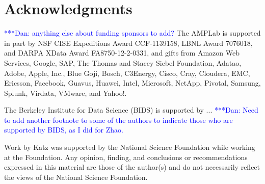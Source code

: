\documentclass{sig-alternate}
\newcommand{\katznote}[1]{ {\textcolor{blue}    { ***Dan:      #1 }}}
\newcommand{\zhaonote}[1]{{\textcolor{cyan}    { ***Zhao:      #1 }}}
\newcommand{\katznote}[1]{}
\newcommand{\zhaonote}[1]{}
\begin{document}
\section{Acknowledgments}
\katznote{anything else about funding sponsors to add?}
The AMPLab is supported in part by NSF CISE Expeditions Award CCF-1139158, LBNL Award 7076018, and DARPA XData Award FA8750-12-2-0331, and gifts from Amazon Web Services, Google, SAP,  The Thomas and Stacey Siebel Foundation, Adatao, Adobe, Apple, Inc., Blue Goji, Bosch, C3Energy, Cisco, Cray, Cloudera, EMC, Ericsson, Facebook, Guavus, Huawei, Intel, Microsoft, NetApp, Pivotal, Samsung, Splunk, Virdata, VMware, and Yahoo!. 

The Berkeley Institute for Data Science (BIDS) is  supported by ... \katznote{Need to add another footnote to some of the authors to indicate those who are supported by BIDS, as I did for Zhao.} 


Work by Katz was supported by the National
Science Foundation while working at the Foundation.  Any opinion, finding, and
conclusions or recommendations expressed in this material are those of the
author(s) and do not necessarily reflect the views of the National Science
Foundation.





\end{document}
